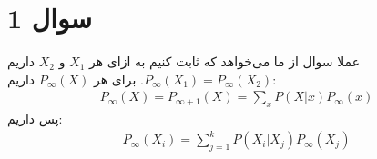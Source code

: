 \section*{سوال 1}
عملا سوال از ما می‌خواهد که ثابت کنیم به ازای هر
$X_1$ و $X_2$
داریم
$P_{\infty}(X_1) = P_{\infty}(X_2)$.
برای هر
$P_{\infty}(X)$
داریم:
\begin{gather*}
    P_{\infty}(X) = P_{\infty+1}(X) = \sum_{x} P(X | x) P_{\infty}(x)
\end{gather*}
پس داریم:
\begin{align*}
    P_{\infty}(X_i) = \sum_{j=1}^{k} P(X_i | X_j) P_{\infty}(X_j)
\end{align*}